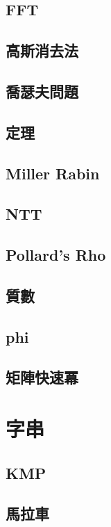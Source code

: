 \documentclass[a4paper,10pt,twocolumn,oneside]{article}
\begin{document}
\subsection{FFT}

\subsection{高斯消去法}

\subsection{喬瑟夫問題}

\subsection{定理}

\subsection{Miller Rabin}

\subsection{NTT}

\subsection{Pollard's Rho}

\subsection{質數}

\subsection{phi}

\subsection{矩陣快速冪}

\section{字串}
\subsection{KMP}

\subsection{馬拉車}

\end{document}
